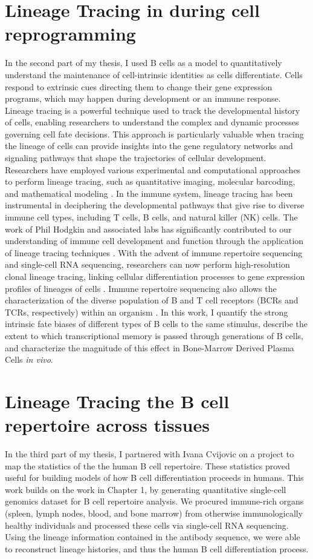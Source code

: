 \section{Lineage Tracing in during cell reprogramming}
In the second part of my thesis, I used B cells as a model to quantitatively understand the maintenance of cell-intrinsic identities as cells differentiate. Cells respond to extrinsic cues directing them to change their gene expression programs, which may happen during development or an immune response. Lineage tracing is a powerful technique used to track the developmental history of cells, enabling researchers to understand the complex and dynamic processes governing cell fate decisions. This approach is particularly valuable when tracing the lineage of cells can provide insights into the gene regulatory networks and signaling pathways that shape the trajectories of cellular development. Researchers have employed various experimental and computational approaches to perform lineage tracing, such as quantitative imaging, molecular barcoding, and mathematical modeling \cite{alon2006introduction, lauffenburger2000quantitative, munsky2012using}. In the immune system, lineage tracing has been instrumental in deciphering the developmental pathways that give rise to diverse immune cell types, including T cells, B cells, and natural killer (NK) cells. The work of Phil Hodgkin and associated labs has significantly contributed to our understanding of immune cell development and function through the application of lineage tracing techniques \cite{hodgkin2012cell, marchingo2014t}. With the advent of immune repertoire sequencing and single-cell RNA sequencing, researchers can now perform high-resolution clonal lineage tracing, linking cellular differentiation processes to gene expression profiles of lineages of cells \cite{stubbington2017t, horns2020memory}. Immune repertoire sequencing also allows the characterization of the diverse population of B and T cell receptors (BCRs and TCRs, respectively) within an organism \cite{robins2013immunosequencing, georgiou_promise_2014}. In this work, I quantify the strong intrinsic fate biases of different types of B cells to the same stimulus, describe the extent to which transcriptional memory is passed through generations of B cells, and characterize the magnitude of this effect in Bone-Marrow Derived Plasma Cells \textit{in vivo}.
\section{Lineage Tracing the B cell repertoire across tissues}
In the third part of my thesis, I partnered with Ivana Cvijovic on a project to map the statistics of the the human B cell repertoire. These statistics proved useful for building models of how B cell differentiation proceeds in humans. This work builds on the work in Chapter 1, by generating quantitative single-cell genomics dataset for B cell repertoire analysis. We procured immune-rich organs (spleen, lymph nodes, blood, and bone marrow) from otherwise immunologically healthy individuals and processed these cells via single-cell RNA sequencing. Using the lineage information contained in the antibody sequence, we were able to reconstruct lineage histories, and thus the human B cell differentiation process.
